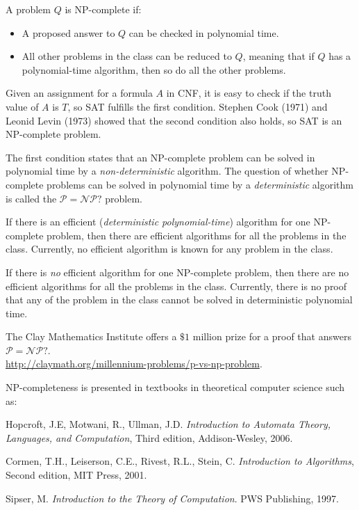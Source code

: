 \documentclass[11pt,a4paper]{article}
\begin{document}
A problem $Q$ is NP-complete if:
\begin{itemize}
\item A proposed answer to $Q$ can be checked in polynomial time.
\item All other problems in the class can be reduced to $Q$, meaning that if $Q$ has a polynomial-time algorithm, then so do all the other problems.
\end{itemize}
Given an assignment for a formula $A$ in CNF, it is easy to check if the truth value of $A$ is $T$, so SAT fulfills the first condition. Stephen Cook (1971) and Leonid Levin (1973) showed that the second condition also holds, so SAT is an NP-complete problem.

The first condition states that an NP-complete problem can be solved in polynomial time by a \emph{non-deterministic} algorithm. The question of whether NP-complete problems can be solved in polynomial time by a \emph{deterministic} algorithm is called the $\mathcal{P}=\mathcal{NP}?$ problem.

If there is an efficient (\emph{deterministic polynomial-time}) algorithm for one NP-complete problem, then there are efficient algorithms for all the problems in the class. Currently, no efficient algorithm is known for any problem in the class.

If there is \emph{no} efficient algorithm for one NP-complete problem, then there are no efficient algorithms for all the problems in the class. Currently, there is no proof that any of the problem in the class cannot be solved in deterministic polynomial time.

The Clay Mathematics Institute offers a $\$1$ million prize for a proof that answers $\mathcal{P}=\mathcal{NP}?$.\\ \url{http://claymath.org/millennium-problems/p-vs-np-problem}.

NP-completeness is presented in textbooks in theoretical computer science such as:

Hopcroft, J.E, Motwani, R., Ullman, J.D. \textit{Introduction to Automata Theory, Languages, and Computation}, Third edition,  Addison-Wesley, 2006.

Cormen, T.H., Leiserson, C.E., Rivest, R.L., Stein, C. \textit{Introduction to Algorithms}, Second edition, MIT Press, 2001.

Sipser, M. \textit{Introduction to the Theory of Computation}. PWS Publishing, 1997.
\end{document}
